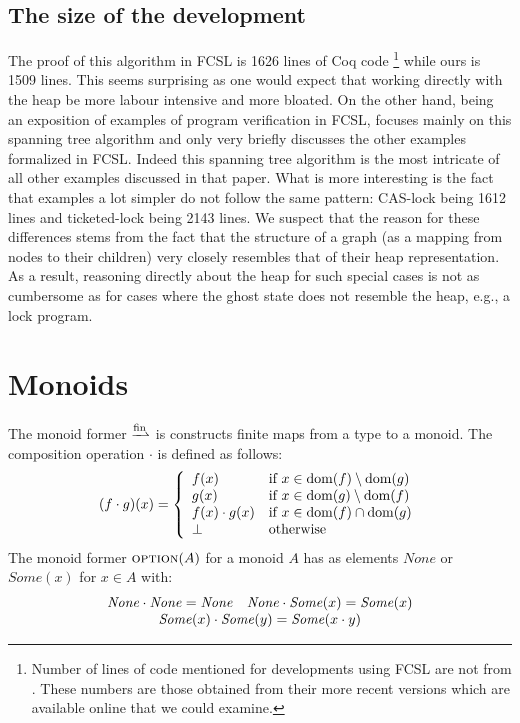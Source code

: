 \documentclass[]{scrartcl}
\newcommand{\None}{\mathit{None}}
\newcommand{\Some}{\mathit{Some}}
\newcommand{\option}{\textmon{option}}
\begin{document}
\subsection{The size of the development}
The proof of this algorithm in FCSL is 1626 lines of Coq code%
\footnote{Number of lines of code mentioned for developments using FCSL are not from
\cite{Sergey:2015:MVF:2737924.2737964}.
These numbers are those obtained from their more recent versions which are available online that we could examine.}
while ours is 1509 lines.
This seems surprising as one would expect that working directly with the heap be more
labour intensive and more bloated.
On the other hand, \cite{Sergey:2015:MVF:2737924.2737964} being an exposition of
examples of program verification in FCSL, focuses mainly on this spanning tree algorithm and
only very briefly discusses the other examples formalized in FCSL.
Indeed this spanning tree algorithm is the most intricate of all other examples discussed in that paper.
What is more interesting is the fact that examples a lot simpler do not follow the same pattern:
CAS-lock being 1612 lines and ticketed-lock being 2143 lines.
We suspect that the reason for these differences stems from the fact that the structure of
a graph (as a mapping from nodes to their children) very closely resembles that of their heap
representation.
As a result, reasoning directly about the heap for such special cases is not as cumbersome
as for cases where the ghost state does not resemble the heap, e.g., a lock program.




\appendix
\section{Monoids}\label{sec:app-mon}
The monoid former $\fpfn$ is constructs finite maps from a type to a monoid.
The composition operation $\cdot$ is defined as follows:
\[
(f \cdot g) (x) = \left\{
\begin{array}{ll}
f(x) & \text{if } x \in \mathrm{dom}(f)\setminus\mathrm{dom}(g)\\
g(x) & \text{if } x \in \mathrm{dom}(g)\setminus\mathrm{dom}(f)\\
f(x) \cdot g(x) & \text{if } x \in \mathrm{dom}(f)\cap\mathrm{dom}(g)\\
\bot & \text{otherwise}
\end{array}
\right.
\]
The monoid former $\option(A)$ for a monoid $A$ has as elements 
$\None$ or $\Some(x)$ for $x \in A$ with:
\[
\begin{array}{ll}
\None \cdot \None = \None & \None \cdot \Some(x) = \Some(x) \\
\multicolumn{2}{c}{\Some(x) \cdot \Some(y) = \Some(x \cdot y)}
\end{array}
\]
\end{document}
